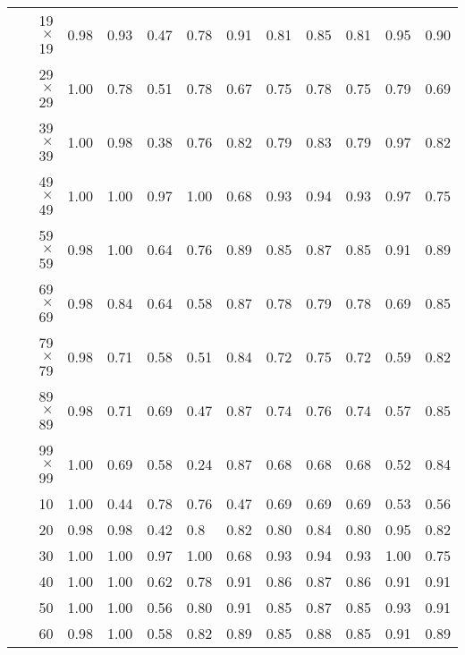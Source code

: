 \begin{table}[htb]
\begin{tabular}{ |rr||L|L|L|L|L|L|L|L|L|L| }
\hline\hline
\parbox[t]{3mm}{} & 19 $\times$  19 & 0.98 & 0.93 & 0.47 & 0.78 & 0.91 & 0.81 & 0.85 & 0.81 &	0.95 & 0.90 \\ %
& 29 $\times$  29 & 1.00& 0.78 & 0.51 & 0.78 & 0.67 & 0.75 & 0.78 &	0.75 & 0.79 & 0.69 \\ %
& 39 $\times$  39 & 1.00& 0.98 & 0.38 & 0.76 & 0.82 & 0.79 & 0.83 &	0.79 & 0.97 & 0.82 \\ %
& 49 $\times$  49 & 1.00 & 1.00 & 0.97 & 1.00 & 0.68 &	0.93 & 0.94 & 0.93 & 0.97 & 0.75 \\ %
& 59 $\times$  59 & 0.98 & 1.00& 0.64 & 0.76 & 0.89 & 0.85 & 0.87 &	0.85 & 0.91 & 0.89 \\ %
& 69 $\times$  69 & 0.98 & 0.84 & 0.64 & 0.58 & 0.87 & 0.78 & 0.79 & 0.78 & 0.69 & 0.85 \\ %
& 79 $\times$  79 & 0.98 & 0.71 & 0.58 & 0.51 & 0.84 & 0.72 & 0.75 & 0.72 &	0.59 & 0.82\\ %
& 89 $\times$  89 & 0.98 & 0.71 & 0.69 & 0.47 & 0.87 & 0.74 & 0.76 & 0.74 & 0.57 & 0.85 \\ %
& 99 $\times$  99 & 1.00& 0.69 & 0.58 & 0.24 & 0.87 & 0.68 & 0.68 &	0.68 & 0.52 & 0.84 \\ %
\hline\hline
\parbox[t]{3mm}{} & 10 & 1.00& 0.44 & 0.78 & 0.76 & 0.47 & 0.69 & 0.69 &	0.69 & 0.53 & 0.56\\ %
& 20 & 0.98 &	0.98	& 0.42 & 0.8 &	0.82 &	0.80 & 0.84 &	0.80 &	0.95 &	0.82\\ %
& 30 & 1.00 &	1.00 & 0.97 & 1.00 & 0.68 & 0.93 & 0.94 & 0.93 &	1.00 & 0.75\\ %
& 40 & 1.00&	1.00 &	0.62 &	0.78 &	0.91 &	0.86 &	0.87 &	0.86 &	0.91 & 0.91\\ %
& 50 & 1.00& 1.00& 0.56 & 0.80 & 0.91 & 0.85 &	0.87 & 0.85 & 0.93 & 0.91 \\ %
& 60 & 0.98 & 1.00& 0.58 & 0.82 & 0.89 & 0.85 & 0.88 &	0.85 & 0.91 & 0.89 \\ %

\end{tabular}
\end{table}
